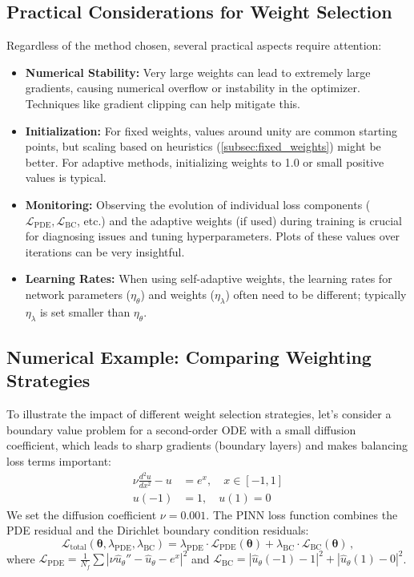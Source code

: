\subsection{Practical Considerations for Weight Selection}

Regardless of the method chosen, several practical aspects require attention:

\begin{itemize} 
    \item \textbf{Numerical Stability:} Very large weights can lead to extremely large gradients, causing numerical overflow or instability in the optimizer. Techniques like gradient clipping can help mitigate this.
    \item \textbf{Initialization:} For fixed weights, values around unity are common starting points, but scaling based on heuristics (\cref{subsec:fixed_weights}) might be better. For adaptive methods, initializing weights to 1.0 or small positive values is typical.
    \item \textbf{Monitoring:} Observing the evolution of individual loss components ($\mathcal{L}_{\text{PDE}}, \mathcal{L}_{\text{BC}}$, etc.) and the adaptive weights (if used) during training is crucial for diagnosing issues and tuning hyperparameters. Plots of these values over iterations can be very insightful.
    \item \textbf{Learning Rates:} When using self-adaptive weights, the learning rates for network parameters ($\eta_\theta$) and weights ($\eta_\lambda$) often need to be different; typically $\eta_\lambda$ is set smaller than $\eta_\theta$.
\end{itemize}

\subsection{Numerical Example: Comparing Weighting Strategies}
\label{subsec:weighting_example}

To illustrate the impact of different weight selection strategies, let's consider a boundary value problem for a second-order ODE with a small diffusion coefficient, which leads to sharp gradients (boundary layers) and makes balancing loss terms important:
%
\begin{align*}
\nu \frac{d^2 u}{d x^2} - u &= e^x, \quad x \in [-1,1] \\
u(-1) &= 1, \quad u(1) = 0
\end{align*}
%
We set the diffusion coefficient $\nu = 0.001$. The PINN loss function combines the PDE residual and the Dirichlet boundary condition residuals:
%
\begin{equation*}
\mathcal{L}_{\text{total}}(\boldsymbol{\theta}, \lambda_{\text{PDE}}, \lambda_{\text{BC}}) = \lambda_{\text{PDE}}\cdot\mathcal{L}_{\text{PDE}}(\boldsymbol{\theta}) + \lambda_{\text{BC}}\cdot\mathcal{L}_{\text{BC}}(\boldsymbol{\theta}) \,,
\end{equation*}
%
where $\mathcal{L}_{\text{PDE}} = \frac{1}{N_f}\sum |\nu \hat{u}_\theta'' - \hat{u}_\theta - e^x|^2$ and $\mathcal{L}_{\text{BC}} = |\hat{u}_\theta(-1) - 1|^2 + |\hat{u}_\theta(1) - 0|^2$.

